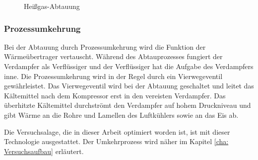 \begin{figure}[htb]
\centering
{}
\caption{Heißgas-Abtauung \citep{Kosowski2009}}
\label{fig:Heissgas-Abtauung}
\end{figure}



\subsubsection*{Prozessumkehrung}

Bei der Abtauung durch Prozessumkehrung wird die Funktion der Wärmeübertrager vertauscht. Während des Abtauprozesses fungiert der Verdampfer als Verflüssiger und der Verflüssiger hat die Aufgabe des Verdampfers inne. Die Prozessumkehrung wird in der Regel durch ein Vierwegeventil gewährleistet. Das Vierwegeventil wird bei der Abtauung geschaltet und leitet das Kältemittel nach dem Kompressor erst in den vereisten Verdampfer. Das überhitzte Kältemittel durchströmt den Verdampfer auf hohem Druckniveau und gibt Wärme an die Rohre und Lamellen des Luftkühlers sowie an das Eis ab.

Die Versuchsalage, die in dieser Arbeit optimiert worden ist, ist mit dieser Technologie ausgestattet. Der Umkehrprozess wird näher im Kapitel \ref{cha: Versuchsaufbau} erläutert. 


